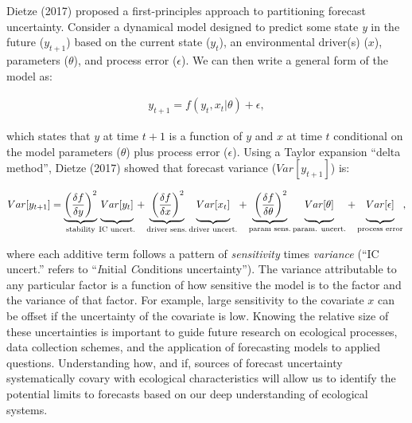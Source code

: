 \documentclass[12pt,]{article}
\begin{document}
Dietze (2017) proposed a first-principles approach to partitioning
forecast uncertainty. Consider a dynamical model designed to predict
some state \emph{y} in the future (\(y_{t+1}\)) based on the current
state (\(y_{t}\)), an environmental driver(s) (\(x\)), parameters
(\(\theta\)), and process error (\(\epsilon\)). We can then write a
general form of the model as: \vspace{-2em}

\begin{align}
y_{t+1} = f(y_t, x_t|\theta) + \epsilon,
\end{align}

which states that \(y\) at time \(t+1\) is a function of \(y\) and \(x\)
at time \(t\) conditional on the model parameters (\(\theta\)) plus
process error (\(\epsilon\)). Using a Taylor expansion ``delta method'',
Dietze (2017) showed that forecast variance (\(Var[y_{t+1}]\)) is:
\vspace{-1em}

\begin{align}
Var[y_{t+1}] = \underbrace{\left(\frac{\delta f}{\delta y} \right)^2}_{\text{stability}} 
               \underbrace{\vphantom{ \left(\frac{\delta f}{\delta y} \right)^2 } Var[y_t]}_{\text{IC uncert.}} +
               \underbrace{\vphantom{ \left(\frac{\delta f}{\delta y} \right)^2 }\left(\frac{\delta f}{\delta x} \right)^2}_{\text{driver sens.}} 
               \underbrace{\vphantom{ \left(\frac{\delta f}{\delta y} \right)^2 } Var[x_t]}_{\text{driver uncert.}} +
               \underbrace{\vphantom{ \left(\frac{\delta f}{\delta y} \right)^2 }\left(\frac{\delta f}{\delta \theta} \right)^2}_{\text{param sens.}}
               \underbrace{\vphantom{ \left(\frac{\delta f}{\delta y} \right)^2 } Var[\theta]}_{\text{param. uncert.}} +
               \underbrace{\vphantom{ \left(\frac{\delta f}{\delta y} \right)^2 } Var[\epsilon]}_{\text{process error}},
\end{align}

where each additive term follows a pattern of \emph{sensitivity} times
\emph{variance} (``IC uncert.'' refers to ``\emph{I}nitial
\emph{C}onditions uncertainty''). The variance attributable to any
particular factor is a function of how sensitive the model is to the
factor and the variance of that factor. For example, large sensitivity
to the covariate \(x\) can be offset if the uncertainty of the covariate
is low. Knowing the relative size of these uncertainties is important to
guide future research on ecological processes, data collection schemes,
and the application of forecasting models to applied questions.
Understanding how, and if, sources of forecast uncertainty
systematically covary with ecological characteristics will allow us to
identify the potential limits to forecasts based on our deep
understanding of ecological systems.
\end{document}
